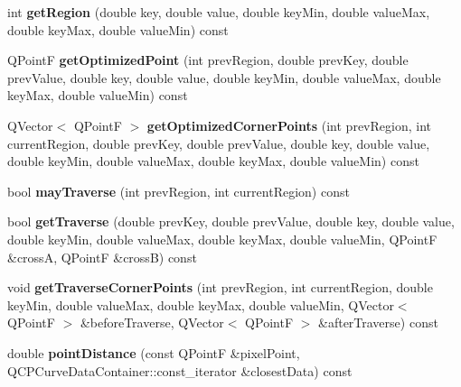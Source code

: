 \begin{DoxyCompactItemize}
int {\bfseries get\+Region} (double key, double value, double key\+Min, double value\+Max, double key\+Max, double value\+Min) const
\item 
\mbox{\label{class_q_c_p_curve_a1d4530a81f718a2085df03d6a059d5d8}} 
Q\+PointF {\bfseries get\+Optimized\+Point} (int prev\+Region, double prev\+Key, double prev\+Value, double key, double value, double key\+Min, double value\+Max, double key\+Max, double value\+Min) const
\item 
\mbox{\label{class_q_c_p_curve_a66bff7933dac149c4577ad63a27da924}} 
Q\+Vector$<$ Q\+PointF $>$ {\bfseries get\+Optimized\+Corner\+Points} (int prev\+Region, int current\+Region, double prev\+Key, double prev\+Value, double key, double value, double key\+Min, double value\+Max, double key\+Max, double value\+Min) const
\item 
\mbox{\label{class_q_c_p_curve_af5df2560b30333fe662ec676bd355415}} 
bool {\bfseries may\+Traverse} (int prev\+Region, int current\+Region) const
\item 
\mbox{\label{class_q_c_p_curve_afc5367ef0369d7a88ebba6eacf55f14f}} 
bool {\bfseries get\+Traverse} (double prev\+Key, double prev\+Value, double key, double value, double key\+Min, double value\+Max, double key\+Max, double value\+Min, Q\+PointF \&crossA, Q\+PointF \&crossB) const
\item 
\mbox{\label{class_q_c_p_curve_a55e24387fd97a2cad0def8a40809e9ec}} 
void {\bfseries get\+Traverse\+Corner\+Points} (int prev\+Region, int current\+Region, double key\+Min, double value\+Max, double key\+Max, double value\+Min, Q\+Vector$<$ Q\+PointF $>$ \&before\+Traverse, Q\+Vector$<$ Q\+PointF $>$ \&after\+Traverse) const
\item 
\mbox{\label{class_q_c_p_curve_aa2c9c9c0e57f11f18a5cb7e47927157c}} 
double {\bfseries point\+Distance} (const Q\+PointF \&pixel\+Point, Q\+C\+P\+Curve\+Data\+Container\+::const\+\_\+iterator \&closest\+Data) const
\end{DoxyCompactItemize}
